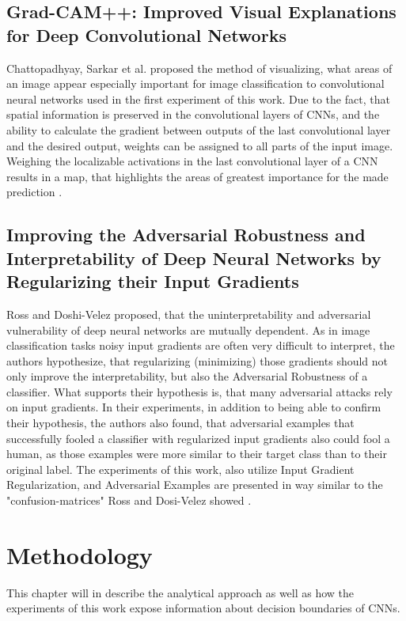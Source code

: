 \documentclass[draft,final]{vutinfth} %
\begin{document}
\section{Grad-CAM++: Improved Visual Explanations for Deep Convolutional Networks}
Chattopadhyay, Sarkar et al. proposed the method of visualizing, what areas of an image appear especially important for image classification to convolutional neural networks used in the first experiment of this work. 
Due to the fact, that spatial information is preserved in the convolutional layers of CNNs, and the ability to calculate the gradient between outputs of the last convolutional layer and the desired output, weights can be assigned to all parts of the input image.
Weighing the localizable activations in the last convolutional layer of a CNN results in a map, that highlights the areas of greatest importance for the made prediction \cite{Chattopadhyay2017}.
\section{Improving the Adversarial Robustness and Interpretability of Deep Neural Networks by Regularizing their Input Gradients}
Ross and Doshi-Velez proposed, that the uninterpretability and adversarial vulnerability of deep neural networks are mutually dependent.
As in image classification tasks noisy input gradients are often very difficult to interpret, the authors hypothesize, that regularizing (minimizing) those gradients should not only improve the interpretability, but also the Adversarial Robustness of a classifier.
What supports their hypothesis is, that many adversarial attacks rely on input gradients.
In their experiments, in addition to being able to confirm their hypothesis, the authors also found, that adversarial examples that successfully fooled a classifier with regularized input gradients also could fool a human, as those examples were more similar to their target class than to their original label.
The experiments of this work, also utilize Input Gradient Regularization, and Adversarial Examples are presented in way similar to the "confusion-matrices" Ross and Dosi-Velez showed \cite{Ross2017}.



\chapter{Methodology}

This chapter will in describe the analytical approach as well as how the experiments of this work expose information about decision boundaries of CNNs.\\
\end{document}
